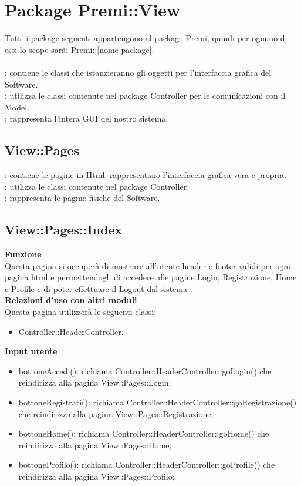 \section{Package Premi::View}{
	Tutti i package seguenti appartengono al package Premi, quindi per ognuno di essi lo scope sarà: Premi::[nome package]. \\\\
	\textbf{\tipo}: contiene le classi che istanzieranno gli oggetti per l'interfaccia grafica del Software.\\
	\textbf{\relaz}: utilizza le classi contenute nel package Controller per le comunicazioni con il Model.\\
	\textbf{\attivita}: rappresenta l'intera GUI del nostro sistema.
\subsection{View::Pages}{
\textbf{\tipo}: contiene le pagine in Html, rappresentano l'interfaccia grafica vera e propria.\\
\textbf{\relaz}: utilizza le classi contenute nel package Controller.\\
\textbf{\attivita}: rappresenta le pagine fisiche del Software.
}
\subsection{View::Pages::Index}{
	\textbf{Funzione}\\
		\indent Questa pagina si occuperà di mostrare all'utente header e footer validi per ogni pagina html e permettendogli di accedere alle pagine Login, Registrazione, Home e Profile e di poter effettuare il Logout dal sistema .\\
	\textbf{Relazioni d'uso con altri moduli}\\
		\indent Questa pagina utilizzerà le seguenti classi:
	\begin{itemize}
		\item Controller::HeaderController.
	\end{itemize}
	\textbf{Input utente}
		\begin{itemize}
		\item bottoneAccedi(): richiama Controller::HeaderController::goLogin() che reindirizza alla pagina View::Pages::Login;
		\item bottoneRegistrati(): richiama Controller::HeaderController::goRegistrazione() che reindirizza alla pagina View::Pages::Registrazione;
		\item bottoneHome(): richiama Controller::HeaderController::goHome() che reindirizza alla pagina View::Pages::Home;
		\item bottoneProfilo(): richiama Controller::HeaderController::goProfile() che reindirizza alla pagina View::Pages::Profilo;
	\end{itemize}
	}
}
